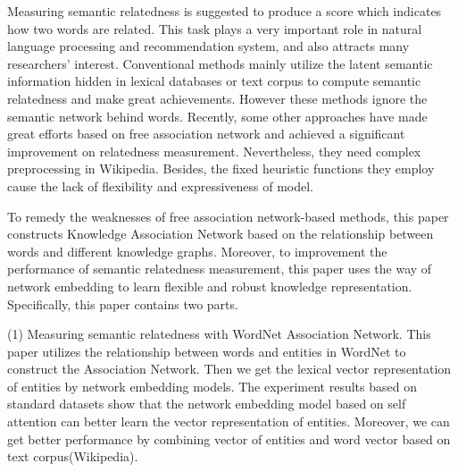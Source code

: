 \begin{englishabstract}


    Measuring semantic relatedness is suggested to produce a score which indicates how two words are related. This task plays a very important role in natural language processing and recommendation system, and also attracts many researchers' interest. Conventional methods mainly utilize the latent semantic information hidden in lexical databases or text corpus to compute semantic relatedness and make great achievements. However these methods ignore the semantic network behind words. Recently, some other approaches have made great efforts based on free association network and achieved a significant improvement on relatedness measurement. Nevertheless, they need complex preprocessing in Wikipedia. Besides, the fixed heuristic functions they employ cause the lack of flexibility and expressiveness of model. 

    To remedy the weaknesses of free association network-based methods, this paper constructs Knowledge Association Network based on the relationship between words and different knowledge graphs. Moreover, to improvement the performance of semantic relatedness measurement, this paper uses the way of network embedding to learn flexible and robust knowledge representation. Specifically, this paper contains two parts.
  
    (1) Measuring semantic relatedness with WordNet Association Network. This paper utilizes the relationship between words and entities in WordNet to construct the Association Network. Then we get the lexical vector representation of entities by network embedding models. The experiment results based on standard datasets show that the network embedding model based on self attention can better learn the vector representation of entities. Moreover, we can get better performance by combining vector of entities and word vector based on text corpus(Wikipedia).
  

\end{englishabstract}
